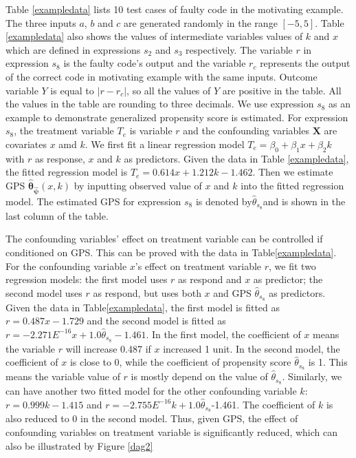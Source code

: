 \documentclass[times]{stvrauth}
\begin{document}
Table \ref{exampledata} lists 10 test cases of faulty code in the motivating example. The three inputs $a$, $b$ and $c$ are generated randomly in the range $[-5, 5]$.  Table \ref{exampledata} also shows the values of intermediate variables values of $k$ and $x$ which are defined in expressions $s_2$ and $s_3$ respectively. The variable $r$ in expression $s_8$ is the faulty code's output and the variable $r_c$ represents the output of the correct code in motivating example with the same inputs. Outcome variable $Y$ is equal to $|r-r_c|$, so all the values of $Y$ are positive in the table. All the values in the table are rounding to three decimals. We use expression $s_8$ as an example to demonstrate generalized propensity score is estimated. For expression $s_8$, the treatment variable $T_e$ is variable $r$ and the confounding variables $\pmb{X}$ are covariates $x$ amd $k$. We first fit a linear regression model $T_e = \beta_0+{\beta_1}x+{\beta_2}k$ with $r $ as response, $x$ and $k$ as predictors. Given the data in Table \ref{exampledata}, the fitted regression model is $ T_e =0.614x+1.212k-1.462$. Then we estimate GPS ${{\hat{\pmb{\theta}} }_{\hat{ \pmb{\psi}} }}(x, k)$  by inputting observed value of $x$ and $k$ into the fitted regression model.  The estimated GPS for expression $s_8$ is denoted by$ {\hat{\theta}}_{s_8} $and is shown in the last column of the table.  

The confounding variables' effect on treatment variable can be controlled if conditioned on GPS. This can be proved with the data in Table\ref{exampledata}. For the confounding variable $x$'s effect on treatment variable $r$, we fit two regression models: the first model uses $r$ as respond and $x$ as predictor; the second model uses $r$ as respond, but uses both $x$ and GPS ${\hat{\theta}}_{s_8}$ as predictors. Given the data in Table\ref{exampledata}, the first model is fitted as $ r =0.487x-1.729$ and the second model is fitted as $r=-2.271E^{-16}x+ 1.0{\hat{\theta}}_{s_8}-1.461$. In the first model, the coefficient of $x$ means the variable $r$ will increase 0.487 if $x$ increased 1 unit. In the second model, the coefficient of $x$ is close to 0, while the coefficient of propensity score ${\hat{\theta}}_{s_8}$ is 1. This means the variable value of $r$ is mostly depend on the value of  ${\hat{\theta}}_{s_8}$. Similarly, we can have another two fitted model for the other confounding variable $k$: $r=0.999k-1.415$  and $r=-2.755E^{-16}k+1.0{\hat{\theta}}_{s_8}$-1.461.  The coefficient of $k$ is also reduced to 0 in the second model.  Thus, given GPS, the effect of confounding variables on treatment variable is significantly reduced, which can also be illustrated by Figure \ref{dag2}
\end{document}
